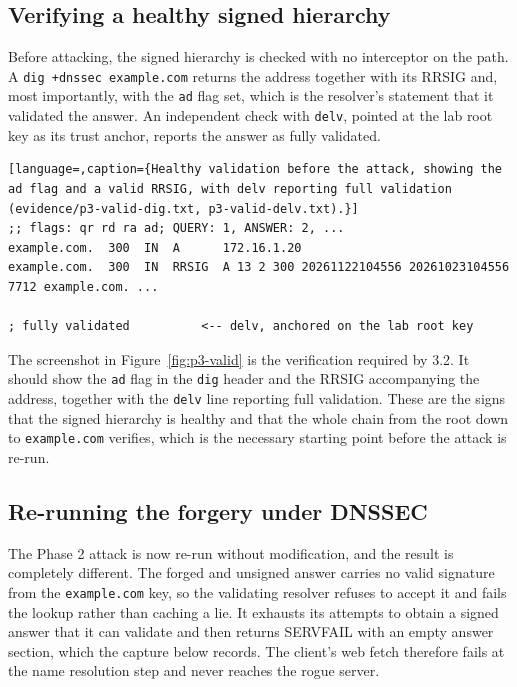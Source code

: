 \documentclass[11pt]{article}
\begin{document}
\subsection{Verifying a healthy signed hierarchy}

Before attacking, the signed hierarchy is checked with no interceptor on the path.
A \texttt{dig +dnssec example.com} returns the address together with its RRSIG and,
most importantly, with the \texttt{ad} flag set, which is the resolver's statement
that it validated the answer. An independent check with \texttt{delv}, pointed at
the lab root key as its trust anchor, reports the answer as fully validated.

\begin{lstlisting}[language=,caption={Healthy validation before the attack, showing the ad flag and a valid RRSIG, with delv reporting full validation (evidence/p3-valid-dig.txt, p3-valid-delv.txt).}]
;; flags: qr rd ra ad; QUERY: 1, ANSWER: 2, ...
example.com.  300  IN  A      172.16.1.20
example.com.  300  IN  RRSIG  A 13 2 300 20261122104556 20261023104556 7712 example.com. ...

; fully validated          <-- delv, anchored on the lab root key
\end{lstlisting}


The screenshot in Figure~\ref{fig:p3-valid} is the verification required by 3.2.
It should show the \texttt{ad} flag in the \texttt{dig} header and the RRSIG
accompanying the address, together with the \texttt{delv} line reporting full
validation. These are the signs that the signed hierarchy is healthy and that the
whole chain from the root down to \texttt{example.com} verifies, which is the
necessary starting point before the attack is re-run.

\subsection{Re-running the forgery under DNSSEC}

The Phase 2 attack is now re-run without modification, and the result is completely
different. The forged and unsigned answer carries no valid signature from the
\texttt{example.com} key, so the validating resolver refuses to accept it and fails
the lookup rather than caching a lie. It exhausts its attempts to obtain a signed
answer that it can validate and then returns SERVFAIL with an empty answer section,
which the capture below records. The client's web fetch therefore fails at the name
resolution step and never reaches the rogue server.
\end{document}
